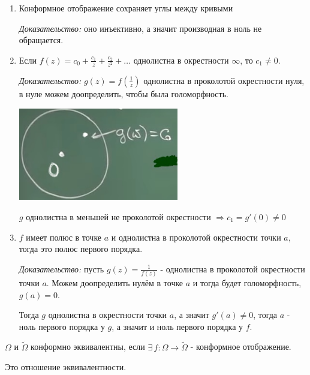 \begin{consequence}
    \begin{enumerate}
        \item {
            Конформное отображение сохраняет углы между кривыми

            \textit{Доказательство: } оно инъективно, а значит производная в ноль не обращается.
        }
        \item {
            Если $f(z) = c_0 + \frac{c_1}{z} + \frac{c_2}{z^2} + \ldots$ однолистна
            в окрестности $\infty$, то $c_1 \neq 0$.

            \textit{Доказательство: } $g(z) = f(\frac{1}{z})$ однолистна в проколотой окрестности нуля, в нуле можем доопределить, чтобы была голоморфность.

            \begin{center}
                \includegraphics[width=7cm]{assets/04-functions-of-complex-variables/conf-func-consequence-2.jpg}
            \end{center}
            $g$ однолистна в меньшей не проколотой окрестности $\Rightarrow c_1 = g'(0) \neq 0$
        }
        \item {
            $f$ имеет полюс в точке $a$ и однолистна в проколотой окрестности точки $a$,
            тогда это полюс первого порядка.

            \textit{Доказательство: } пусть $g(z) = \frac{1}{f(z)}$ - однолистна в проколотой окрестности точки $a$.
            Можем доопределить нулём в точке $a$ и тогда будет голоморфность, $g(a) = 0$.

            Тогда $g$ однолистна в окрестности точки $a$, а значит $g'(a) \neq 0$, тогда $a$ -
            ноль первого порядка у $g$, а значит и ноль первого порядка у $f$.
        }
    \end{enumerate}
\end{consequence}

\begin{definition}
    $\Omega$ и $\tilde{\Omega}$ конформно эквивалентны, если $\exists \, f : \Omega \to \tilde{\Omega}$ - конформное отображение.

    \begin{remark}
        Это отношение эквивалентности.
    \end{remark}
\end{definition}

